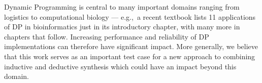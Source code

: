 Dynamic Programming is central to many important domains ranging from logistics to computational biology --- e.g.,~a recent textbook \cite{DurbinEdKr98} lists 11 applications of DP in bioinformatics just in its introductory chapter, with many more in chapters that follow. Increasing performance and reliability of DP implementations can therefore have significant impact. More generally, we believe that this work serves as an important test case for a new approach to combining inductive and deductive synthesis which could have an impact beyond this domain. 








